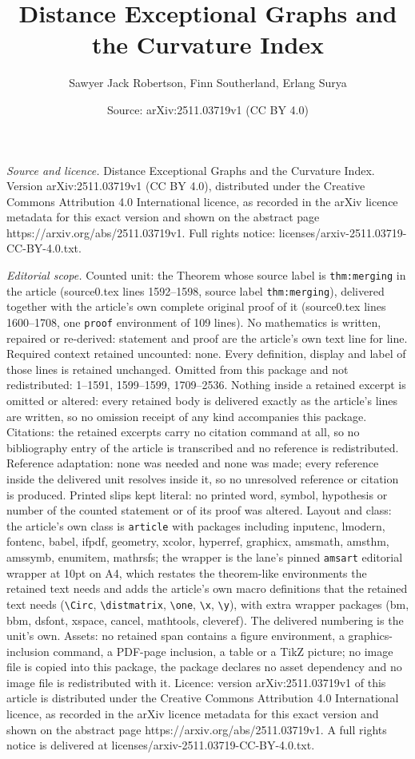 \documentclass[10pt,a4paper]{amsart}
\title[Distance Exceptional Graphs and the Curvature Index]{Distance Exceptional Graphs and the Curvature Index}
\author{Sawyer Jack Robertson, Finn Southerland, Erlang Surya}
\date{Source: arXiv:2511.03719v1 (CC BY 4.0)}
\begin{document}
\maketitle

\noindent\emph{Source and licence.} Distance Exceptional Graphs and the Curvature Index. Version arXiv:2511.03719v1 (CC BY 4.0), distributed under the Creative Commons Attribution 4.0 International licence, as recorded in the arXiv licence metadata for this exact version and shown on the abstract page https://arxiv.org/abs/2511.03719v1. Full rights notice: licenses/arxiv-2511.03719-CC-BY-4.0.txt.\par\smallskip

\noindent\textit{Editorial scope.} Counted unit: the Theorem whose source label is \texttt{thm:merging} in the article (source0.tex lines 1592--1598, source label \texttt{thm:merging}), delivered together with the article's own complete original proof of it (source0.tex lines 1600--1708, one \texttt{proof} environment of 109 lines). No mathematics is written, repaired or re-derived: statement and proof are the article's own text line for line. Required context retained uncounted: none. Every definition, display and label of those lines is retained unchanged. Omitted from this package and not redistributed: 1--1591, 1599--1599, 1709--2536. Nothing inside a retained excerpt is omitted or altered: every retained body is delivered exactly as the article's lines are written, so no omission receipt of any kind accompanies this package. Citations: the retained excerpts carry no citation command at all, so no bibliography entry of the article is transcribed and no reference is redistributed. Reference adaptation: none was needed and none was made; every reference inside the delivered unit resolves inside it, so no unresolved reference or citation is produced. Printed slips kept literal: no printed word, symbol, hypothesis or number of the counted statement or of its proof was altered. Layout and class: the article's own class is \texttt{article} with packages including inputenc, lmodern, fontenc, babel, ifpdf, geometry, xcolor, hyperref, graphicx, amsmath, amsthm, amssymb, enumitem, mathrsfs; the wrapper is the lane's pinned \texttt{amsart} editorial wrapper at 10pt on A4, which restates the theorem-like environments the retained text needs and adds the article's own macro definitions that the retained text needs (\texttt{\textbackslash Circ}, \texttt{\textbackslash distmatrix}, \texttt{\textbackslash one}, \texttt{\textbackslash x}, \texttt{\textbackslash y}), with extra wrapper packages (bm, bbm, dsfont, xspace, cancel, mathtools, cleveref). The delivered numbering is the unit's own. Assets: no retained span contains a figure environment, a graphics-inclusion command, a PDF-page inclusion, a table or a TikZ picture; no image file is copied into this package, the package declares no asset dependency and no image file is redistributed with it. Licence: version arXiv:2511.03719v1 of this article is distributed under the Creative Commons Attribution 4.0 International licence, as recorded in the arXiv licence metadata for this exact version and shown on the abstract page https://arxiv.org/abs/2511.03719v1. A full rights notice is delivered at licenses/arxiv-2511.03719-CC-BY-4.0.txt. 
\end{document}
